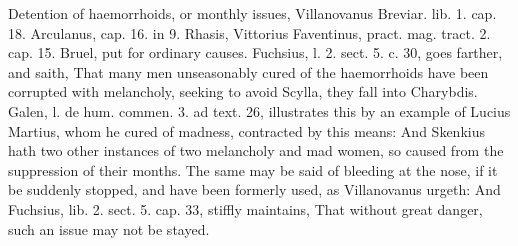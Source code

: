 {{Detention of haemorrhoids, or monthly issues, Villanovanus
Breviar. lib. 1. cap. 18. Arculanus, cap. 16. in 9. Rhasis, Vittorius
Faventinus, pract. mag. tract. 2. cap. 15. Bruel, \etc{} put for ordinary
causes. Fuchsius, l. 2. sect. 5. c. 30, goes farther, and saith,
That many men unseasonably cured of the haemorrhoids have been
corrupted with melancholy, seeking to avoid Scylla, they fall into
Charybdis. Galen, l. de hum. commen. 3. ad text. 26, illustrates this
by an example of Lucius Martius, whom he cured of madness, contracted
by this means: And  Skenkius hath two other instances of two
melancholy and mad women, so caused from the suppression of their
months. The same may be said of bleeding at the nose, if it be suddenly
stopped, and have been formerly used, as Villanovanus urgeth: And
Fuchsius, lib. 2. sect. 5. cap. 33, stiffly maintains, That
without great danger, such an issue may not be stayed.

}}
